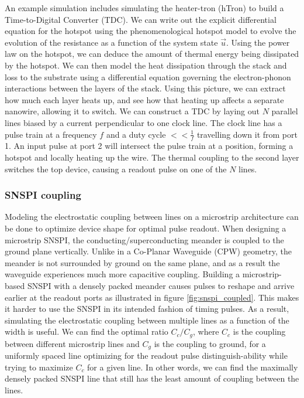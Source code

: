 An example simulation includes simulating the heater-tron (hTron) to build a Time-to-Digital Converter
(TDC). We can write out the explicit differential equation for the hotspot using the phenomenological
hotspot model to evolve the evolution of the resistance as a function of the system state $\vec u$. 
Using the power law on the hotspot, we can deduce the amount of thermal energy being dissipated
by the hotspot. We can then model the heat dissipation through the stack and loss to the substrate
using a differential equation governing the electron-phonon interactions between the layers of the stack.
Using this picture, we can extract how much each layer heats up, and see how that heating up affects
a separate nanowire, allowing it to switch. We can construct a TDC by laying out $N$ parallel 
lines biased by a current perpendicular to one clock line. 
The clock line has a pulse train at a frequency $f$ and a duty cycle 
$<<\frac{1}{f}$ travelling down it from port 1. An input pulse at port 2 will intersect the pulse train 
at a position, forming a hotspot and locally heating up the wire. The thermal coupling to the second
layer switches the top device, causing a readout pulse on one of the $N$ lines. 

\subsubsection{SNSPI coupling}

Modeling the electrostatic coupling between lines on a microstrip architecture can be done
to optimize device shape for optimal pulse readout. When designing a microstrip SNSPI, the
conducting/superconducting meander is coupled to the ground plane vertically. Unlike in a 
Co-Planar Waveguide (CPW) geometry, the meander is not surrounded by ground on the same plane, 
and as a result the waveguide experiences much more capacitive coupling. Building a 
microstrip-based SNSPI with a densely packed meander causes pulses to reshape and
arrive earlier at the readout ports as illustrated in figure \ref{fig:snspi_coupled}. 
This makes it harder to use the SNSPI in its intended
fashion of timing pulses. As a result, simulating the electrostatic coupling between multiple
lines as a function of the width is useful. We can find the optimal ratio $C_c/C_g$, where $C_c$
is the coupling between different microstrip lines and $C_g$ is the coupling to ground,
for a uniformly spaced line optimizing for the readout pulse distinguish-ability while trying to 
maximize $C_c$ for a given line. In other words, we can find the maximally densely packed 
SNSPI line that still has the least amount of coupling between the lines.

